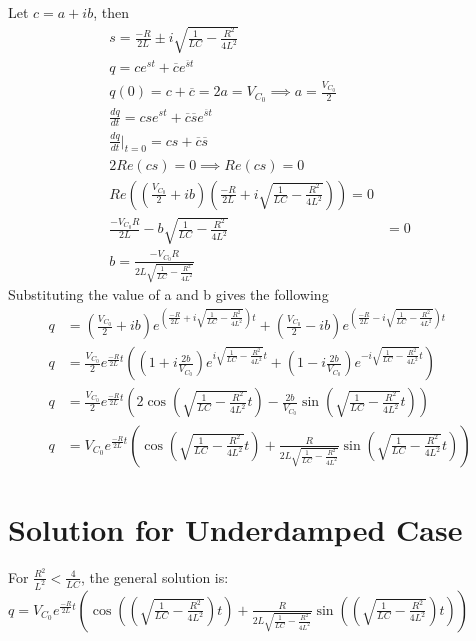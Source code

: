 \documentclass[a4paper,12pt]{article}
\providecommand{\brak}[1]{\ensuremath{\left(#1\right)}}
\begin{document}
Let $c = a+ib$, then
\begin{align*}
  s = \frac{-R}{2L} \pm i \sqrt{\frac{1}{LC} - \frac{R^2}{4L^2}}\\
  q = c e^{st} + \overline{c} e^{\overline{s}t}\\
  q(0) = c + \overline{c} = 2 a = V_{C_0} \implies a = \frac{V_{C_0}}{2}\\
  \frac{dq}{dt} = cs e^{st} + \overline{c} \overline{s} e^{\overline{s}t}\\
  \frac{dq}{dt}\Bigr|_{t=0} = cs + \overline{c} \overline{s}\\
  2 Re(cs) = 0 \implies Re(cs) = 0 \\
  Re((\frac{V_{C_0}}{2} + ib) ( \frac{-R}{2L} + i \sqrt{\frac{1}{LC} - \frac{R^2}{4L^2}} )) = 0\\
  \frac{-V_{C_0} R}{2L} - b \sqrt{\frac{1}{LC} - \frac{R^2}{4L^2}} &= 0\\
  b = \frac{-V_{C_0} R}{2L \sqrt{\frac{1}{LC} - \frac{R^2}{4L^2}}}
\end{align*}
Substituting the value of a and b gives the following
\begin{align*}
  q &= \brak{ \frac{V_{C_0}}{2} + i b } e^{\brak{ \frac{-R}{2L} + i \sqrt{\frac{1}{LC} - \frac{R^2}{4L^2}} } t} + \brak{ \frac{V_{C_0}}{2} - i b } e^{\brak{ \frac{-R}{2L} - i \sqrt{\frac{1}{LC} - \frac{R^2}{4L^2}} } t} \\
  q &= \frac{V_{C_0}}{2} e^{\frac{-R}{2L}t} \brak{ \brak{ 1 + i \frac{2b}{V_{C_0}} } e^{i \sqrt{\frac{1}{LC} - \frac{R^2}{4L^2}} t} + \brak{ 1 - i \frac{2b}{V_{C_0}} } e^{-i \sqrt{\frac{1}{LC} - \frac{R^2}{4L^2}} t} } \\
  q &= \frac{V_{C_0}}{2} e^{\frac{-R}{2L}t} \brak{ 2 \cos \brak{ \sqrt{\frac{1}{LC} - \frac{R^2}{4L^2}} t } - \frac{2 b}{V_{C_0}} \sin \brak{ \sqrt{\frac{1}{LC} - \frac{R^2}{4L^2}} t } } \\
  q &= V_{C_0} e^{\frac{-R}{2L}t} \brak{ \cos \brak{ \sqrt{\frac{1}{LC} - \frac{R^2}{4L^2}} t } + \frac{R}{2L\sqrt{\frac{1}{LC} - \frac{R^2}{4L^2}}} \sin \brak{\sqrt{\frac{1}{LC} - \frac{R^2}{4L^2}} t } }
\end{align*}


\section{Solution for Underdamped Case}
For $\frac{R^2}{L^2} < \frac{4}{LC}$, the general solution is:\newline
 $q = V_{C_0} e^{\frac{-R}{2L}t} \brak{ \cos \brak{\brak{ \sqrt{\frac{1}{LC} - \frac{R^2}{4L^2}}} t } + \frac{R}{2L\sqrt{\frac{1}{LC} - \frac{R^2}{4L^2}}} \sin \brak{\brak{\sqrt{\frac{1}{LC} - \frac{R^2}{4L^2}}}t } }$
\end{document}
